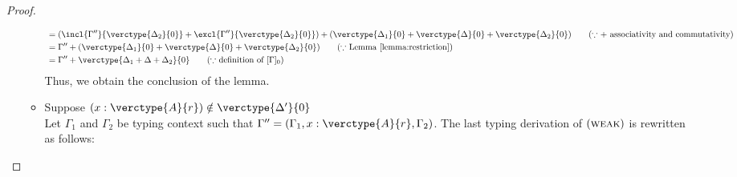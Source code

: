 \begin{proof}
\begin{itemize}
\begin{itemize}
\begin{align*}
    &= (\incl{\Gamma''}{\verctype{\Delta_2}{0}} + \excl{\Gamma''}{\verctype{\Delta_2}{0}}) + (\verctype{\Delta_1}{0} + \verctype{\Delta}{0} + \verctype{\Delta_2}{0}) \tag{$\because$ $+$ associativity and commutativity}\\
    &= \Gamma'' + (\verctype{\Delta_1}{0} + \verctype{\Delta}{0} + \verctype{\Delta_2}{0}) \tag{$\because$ Lemma \ref{lemma:restriction}}\\
    &= \Gamma'' + \verctype{\Delta_1 + \Delta + \Delta_2}{0} \tag{$\because$ definition of $[\Gamma]_0$}
\end{align*}
Thus, we obtain the conclusion of the lemma.

\item Suppose $(x:\verctype{A}{r})\notin\verctype{\Delta'}{0}$\\
Let $\Gamma_1$ and $\Gamma_2$ be typing context such that $\Gamma'' = (\Gamma_1, x:\verctype{A}{r}, \Gamma_2)$.
The last typing derivation of $(\textsc{weak})$ is rewritten as follows:
\begin{center}
    \begin{minipage}{.65\linewidth}
    \end{minipage}
\end{center}


\end{itemize}
\end{itemize}
\end{proof}
